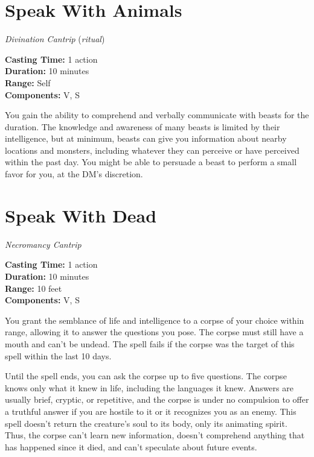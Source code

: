 \documentclass[twocolumn,lettersize]{article}
\begin{document}
  
    {
  

  \section*{Speak With Animals}

    \textit{Divination Cantrip} %
    (\textit{ritual})%
             
  \noindent
  \textbf{Casting Time:} 1 action \\
  \textbf{Duration:} 10 minutes\\
  \textbf{Range:} Self \\
  \textbf{Components:} V, S 

  You gain the ability to comprehend and verbally communicate with beasts for the 
    duration.
    The knowledge and awareness of many beasts is limited by their 
    intelligence, but at minimum, beasts can give you information about nearby 
    locations and monsters, including whatever they can perceive or have perceived 
    within the past day. You might be able to persuade a beast to perform a small 
    favor for you, at the DM's discretion.
    

  } %

  
    {
  

  \section*{Speak With Dead}

    \textit{Necromancy Cantrip} %
             
  \noindent
  \textbf{Casting Time:} 1 action \\
  \textbf{Duration:} 10 minutes\\
  \textbf{Range:} 10 feet \\
  \textbf{Components:} V, S 

  You grant the semblance of life and intelligence to a corpse of your choice 
    within range, allowing it to answer the questions you pose. The corpse must 
    still have a mouth and can't be undead. The spell fails if the corpse was the 
    target of this spell within the last 10 days.
    
    Until the spell ends, you can ask
     the corpse up to five questions. The corpse knows only what it knew in life, 
    including the languages it knew. Answers are usually brief, cryptic, or 
    repetitive, and the corpse is under no compulsion to offer a truthful answer if 
    you are hostile to it or it recognizes you as an enemy. This spell doesn't 
    return the creature's soul to its body, only its animating spirit. Thus, the 
    corpse can't learn new information, doesn't comprehend anything that has 
    happened since it died, and can't speculate about future events.
    

  } %
\end{document}
